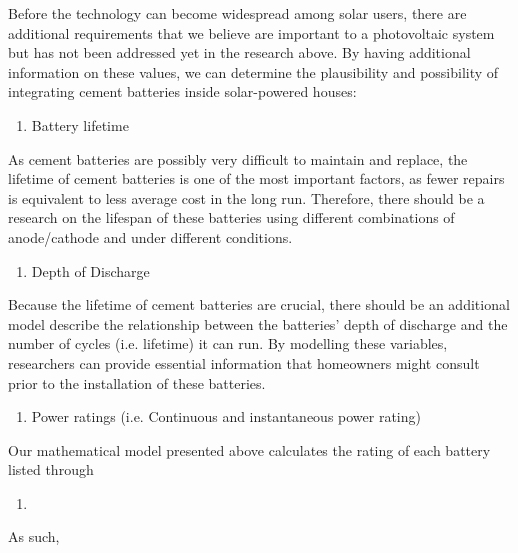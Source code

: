 Before the technology can become widespread among solar users, there are additional requirements that we believe are important to a photovoltaic system but has not been addressed yet in the research above. By having additional information on these values, we can determine the plausibility and possibility of integrating cement batteries inside solar-powered houses:
\begin{enumerate}
    \item Battery lifetime
\end{enumerate}
As cement batteries are possibly very difficult to maintain and replace, the lifetime of cement batteries is one of the most important factors, as fewer repairs is equivalent to less average cost in the long run. Therefore, there should be a research on the lifespan of these batteries using different combinations of anode/cathode and under different conditions.
\begin{enumerate}[resume*]
    \item Depth of Discharge
\end{enumerate}
Because the lifetime of cement batteries are crucial, there should be an additional model describe the relationship between the batteries' depth of discharge and the number of cycles (i.e. lifetime) it can run. By modelling these variables, researchers can provide essential information that homeowners might consult prior to the installation of these batteries.
\begin{enumerate}[resume*]
    \item Power ratings (i.e. Continuous and instantaneous power rating)
\end{enumerate}
Our mathematical model presented above calculates the rating of each battery listed through 
\begin{enumerate}[resume*]
    \item 
\end{enumerate}


As such, 